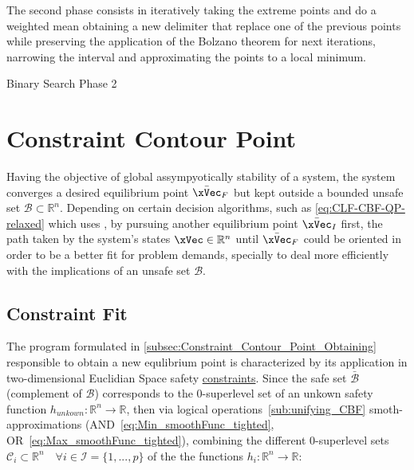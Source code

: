 The second phase consists in iteratively taking the extreme points and do a weighted mean obtaining a new delimiter that replace one of the previous points while preserving the application of the Bolzano theorem for next iterations, narrowing the interval and approximating the points to a local minimum.   

  \begin{algorithm}
    \caption{Binary Search Phase 2} \label{alg:Binary_Search_Phase_2}
  \end{algorithm}



\newpage %


\section{Constraint Contour Point}
\label{sec:Constraint_Contour_Point}

Having the objective of global assympyotically stability of a system, the system converges a desired equilibrium point \(\bar{\xVec}_F\) but kept outside a bounded unsafe set \(\mathcal{B} \subset \mathbb{R}^n\). Depending on certain decision algorithms, such as \ref{eq:CLF-CBF-QP-relaxed} which uses , by pursuing another equilibrium point \(\bar{\xVec}_I\) first, the path taken by the system's states \(\xVec \in \mathbb{R}^n\) until \(\bar{\xVec}_F\) could be oriented in order to be a better fit for problem demands, specially to deal more efficiently with the implications of an unsafe set \(\mathcal{B}\).\\

\subsection{Constraint Fit}
\label{subsec:Constraint_Fit}

The program formulated in \ref{subsec:Constraint_Contour_Point_Obtaining} responsible to obtain a new equlibrium point is characterized by its application in two-dimensional Euclidian Space safety \underline{constraints}. Since the safe set \(\bar{\mathcal{B}}\) (complement of \(\mathcal{B}\)) corresponds to the 0-superlevel set of an unkown safety function \(h_{unkown}: \mathbb{R}^n \to \mathbb{R}\), then via logical operations~\ref{sub:unifying_CBF} smoth-approximations (AND~\ref{eq:Min_smoothFunc_tighted}, OR~\ref{eq:Max_smoothFunc_tighted}), combining the different 0-superlevel sets \(\mathcal{C}_i \subset \mathbb{R}^n \quad \forall i \in \mathcal{I} = \{1,...,p\}\) of the the functions \(h_i: \mathbb{R}^n \to \mathbb{R}\):


